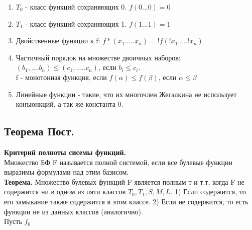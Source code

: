 \documentclass{article}
\begin{document}
\begin{enumerate}
\item $T_0$ - класс функций сохраняющих 0.
$f(0...0) = 0$
\item $T_1$ - класс функций сохраняющих 1.
$f(1...1) = 1$
\item Двойственные функции к f:
$f*(x_1.....x_n) = !f(!x_1.....!x_n)$
\item Частичный порядок на множестве двоичных наборов: $(b_1, .... b_n)\leq (c_1,.....c_n)$, если $b_i \leq c_i$.\\
f - монотонная функция, если $f(\alpha) \leq f(\beta)$, если $\alpha \leq \beta$
\item Линейные функции - такие, что их многочлен Жегалкина не использует конъюнкций, а так же константа 0.
\end{enumerate} 

\subsection{Теорема Пост.}
\textbf{Критерий полноты сисемы функций.}\\
Множество БФ F называется полной системой, если все булевые функции выразимы формулами над этим базисом.\\
\textbf{Теорема.}
Множество булевых функций F является полным т и т.т, когда F не содержится ни в одном из пяти классов $T_0, T_1, S, M, L$.
1) Если содержится, то его замыкание также содержится в этом классе.
2) Если не содержится, то  есть функции не из данных классов (аналогично).\\
Пусть $f_0 $
\end{document}
